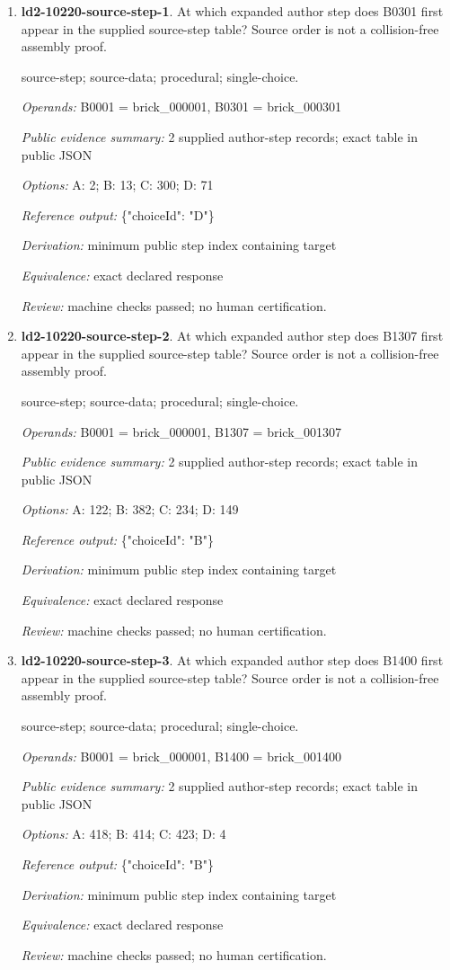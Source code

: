 \begin{enumerate}
\item \textbf{ld2-10220-source-step-1}. At which expanded author step does B0301 first appear in the supplied source-step table? Source order is not a collision-free assembly proof.
\par{\small source-step; source-data; procedural; single-choice.\par\textit{Operands:} B0001 = brick\_000001, B0301 = brick\_000301\par\textit{Public evidence summary:} 2 supplied author-step records; exact table in public JSON\par\textit{Options:} A: 2; B: 13; C: 300; D: 71\par\textit{Reference output:} \{"choiceId": "D"\}\par\textit{Derivation:} minimum public step index containing target\par\textit{Equivalence:} exact declared response\par\textit{Review:} machine checks passed; no human certification.}
\item \textbf{ld2-10220-source-step-2}. At which expanded author step does B1307 first appear in the supplied source-step table? Source order is not a collision-free assembly proof.
\par{\small source-step; source-data; procedural; single-choice.\par\textit{Operands:} B0001 = brick\_000001, B1307 = brick\_001307\par\textit{Public evidence summary:} 2 supplied author-step records; exact table in public JSON\par\textit{Options:} A: 122; B: 382; C: 234; D: 149\par\textit{Reference output:} \{"choiceId": "B"\}\par\textit{Derivation:} minimum public step index containing target\par\textit{Equivalence:} exact declared response\par\textit{Review:} machine checks passed; no human certification.}
\item \textbf{ld2-10220-source-step-3}. At which expanded author step does B1400 first appear in the supplied source-step table? Source order is not a collision-free assembly proof.
\par{\small source-step; source-data; procedural; single-choice.\par\textit{Operands:} B0001 = brick\_000001, B1400 = brick\_001400\par\textit{Public evidence summary:} 2 supplied author-step records; exact table in public JSON\par\textit{Options:} A: 418; B: 414; C: 423; D: 4\par\textit{Reference output:} \{"choiceId": "B"\}\par\textit{Derivation:} minimum public step index containing target\par\textit{Equivalence:} exact declared response\par\textit{Review:} machine checks passed; no human certification.}

\end{enumerate}
